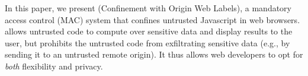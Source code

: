 
In this paper, we present \sys{} (Confinement with Origin Web Labels),
a mandatory access control (MAC) system that confines untrusted
Javascript in web browsers. \sys{} allows untrusted code to compute
over sensitive data and display results to the user, but prohibits the
untrusted code from exfiltrating sensitive data (e.g., by sending it
to an untrusted remote origin). It thus allows web developers to opt
for {\em both} flexibility and privacy.

